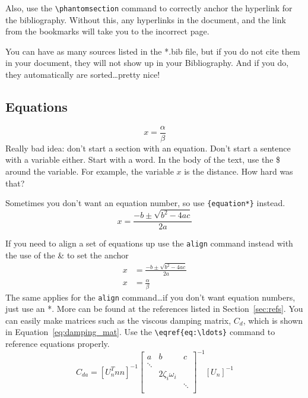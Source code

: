 \documentclass[12pt]{report}
\begin{document}
Also, use the \verb'\phantomsection' command to correctly anchor the hyperlink for the bibliography.  Without this, any hyperlinks in the document, and the link from the bookmarks will take you to the incorrect page.

You can have as many sources listed in the *.bib file, but if you do not cite them in your document, they will not show up in your Bibliography.  And if you do, they automatically are sorted\ldots pretty nice!

\subsection{Equations}\label{sec:equations}
\begin{equation}\label{eq:alphaoverbeta} %
x=\frac{\alpha}{\beta}
\end{equation}
Really bad idea: don't start a section with an equation. Don't start a sentence with a variable either. Start with a word. In the body of the text, use the \$ around the variable.  For example, the variable $x$ is the distance. How hard was that?

Sometimes you don't want an equation  number, so use \verb'{equation*}' instead.
\begin{equation*}
x=\frac{-b\pm\sqrt{b^2-4ac}}{2a}
\end{equation*}

If you need to align a set of equations up use the \verb'align' command instead with the use of the \& to set the anchor
\begin{align}
x&=\frac{-b\pm\sqrt{b^2-4ac}}{2a}\\
x&=\frac{\alpha}{\beta}
\end{align}
The same applies for the \verb'align' command\ldots if you don\rq{}t want equation numbers,  just use an *.  More can be found at the references listed in Section~\ref{sec:refs}.  You can easily make matrices such as the viscous damping matrix, $C_d$, which is shown in Equation~\eqref{eq:damping_mat}.  Use the \verb'\eqref{eq:\ldots}' command to reference equations properly.
%
\begin{equation}
\label{eq:damping_mat}
C_{da} =[U_n^Tnn]^{-1}
\left[ \begin{array}{ccc}
a&b&c\\
	\ddots & 				& \\
	     	& 2 \zeta_i \omega_i 		& \\
		&				& \ddots \\
\end{array} \right]^{{-1}} [U_n]^{-1}
\end{equation}
\end{document}
